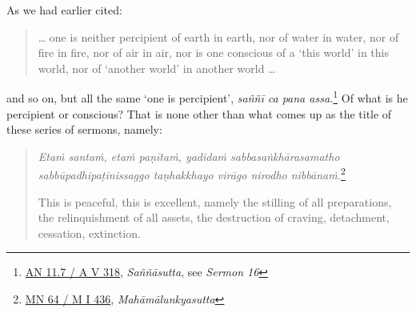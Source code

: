 As we had earlier cited:

\begin{quote}
\ldots{} one is neither percipient of earth in earth, nor of water in water, nor of fire in fire, nor of air in air, nor is one conscious of a `this world' in this world, nor of `another world' in another world \ldots{}
\end{quote}

and so on, but all the same `one is percipient', \emph{saññī ca pana assa.}\footnote{\href{https://suttacentral.net/an11.7/pli/ms}{AN 11.7 / A V 318}, \emph{Saññāsutta}, see \emph{Sermon 16}} Of what is he percipient or conscious? That is none other than what comes up as the title of these series of sermons, namely:

\begin{quote}
\emph{Etaṁ santaṁ, etaṁ paṇītaṁ, yadidaṁ sabbasaṅkhārasamatho sabbūpadhipaṭinissaggo taṇhakkhayo virāgo nirodho nibbānaṁ.}\footnote{\href{https://suttacentral.net/mn64/pli/ms}{MN 64 / M I 436}, \emph{Mahāmālunkyasutta}}

This is peaceful, this is excellent, namely the stilling of all preparations, the relinquishment of all assets, the destruction of craving, detachment, cessation, extinction.
\end{quote}
